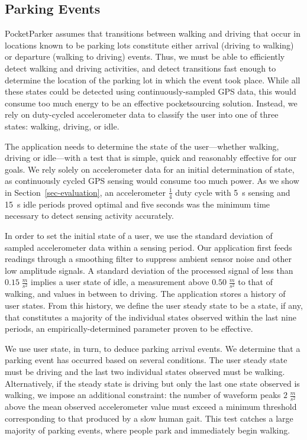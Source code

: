\subsection{Parking Events}
\label{subsec-goals}

PocketParker assumes that transitions between walking and driving that occur
in locations known to be parking lots constitute either arrival (driving to
walking) or departure (walking to driving) events. Thus, we must be able to
efficiently detect walking and driving activities, and detect transitions
fast enough to determine the location of the parking lot in which the event
took place. While all these states could be detected using
continuously-sampled GPS data, this would consume too much energy to be an
effective pocketsourcing solution. Instead, we rely on duty-cycled
accelerometer data to classify the user into one of three states: walking,
driving, or idle.

The application needs to determine the state of the user---whether walking,
driving or idle---with a test that is simple, quick and reasonably effective
for our goals.  We rely solely on accelerometer data for an initial
determination of state, as continuously cycled GPS sensing would consume too
much power. As we show in Section~\ref{sec-evaluation}, an accelerometer
$\frac{1}{4}$ duty cycle with 5~s sensing and 15~s idle periods proved
optimal and five seconds was the minimum time necessary to detect sensing
activity accurately.

In order to set the initial state of a user, we use the standard deviation of
sampled accelerometer data within a sensing period. Our application first
feeds readings through a smoothing filter to suppress ambient sensor noise
and other low amplitude signals. A standard deviation of the processed signal
of less than $0.15\;\frac{m}{s^2}$ implies a user state of idle, a
measurement above $0.50\;\frac{m}{s^2}$ to that of walking, and values in
between to driving. The application stores a history of user states. From
this history, we define the user steady state to be a state, if any, that
constitutes a majority of the individual states observed within the last nine
periods, an empirically-determined parameter proven to be effective.

We use user state, in turn, to deduce parking arrival events. We determine
that a parking event has occurred based on several conditions. The user
steady state must be driving and the last two individual states observed must
be walking. Alternatively, if the steady state is driving but only the last
one state observed is walking, we impose an additional constraint: the number
of waveform peaks $2\;\frac{m}{s^2}$ above the mean observed accelerometer
value must exceed a minimum threshold corresponding to that produced by a
slow human gait.  This test catches a large majority of parking events, where
people park and immediately begin walking.

